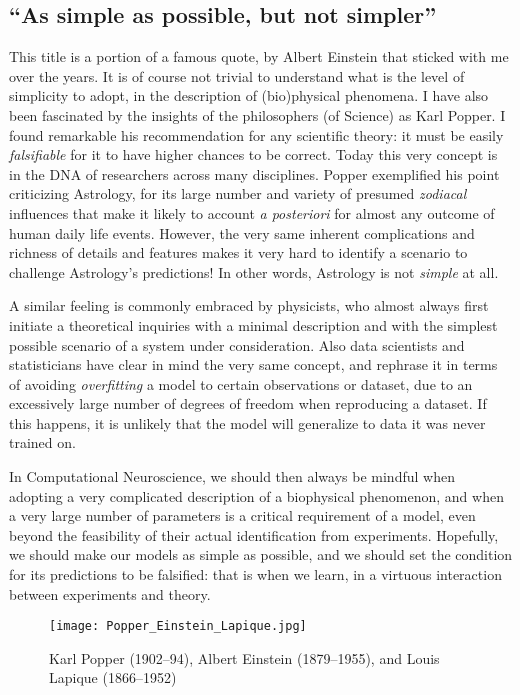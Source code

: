 \subsection{``As simple as possible, but not simpler''}
This title is a portion of a famous quote, by Albert Einstein that sticked with me over the years. It is of course not trivial to understand what is the level of simplicity to adopt, in the description of (bio)physical phenomena. I have also been fascinated by the insights of the philosophers (of Science) as Karl Popper. I found remarkable his recommendation for any scientific theory: it must be easily \textit{falsifiable} for it  to have higher chances to be correct. Today this very concept is in the DNA of researchers across many disciplines. Popper exemplified his point criticizing Astrology, for its large number and variety of presumed \textit{zodiacal} influences that make it likely to account \textit{a posteriori} for almost any outcome of human daily life events. However, the very same inherent complications and richness of details and features makes it very hard to identify a scenario to challenge Astrology's predictions! In other words, Astrology is not \textit{simple} at all.

A similar feeling is commonly embraced by physicists, who almost always first initiate a theoretical inquiries with a minimal description and with the simplest possible scenario of a system under consideration. Also data scientists and statisticians have clear in mind the very same concept, and rephrase it in terms of avoiding \textit{overfitting} a model to certain observations or dataset, due to an excessively large number of degrees of freedom when reproducing a dataset. If this happens, it is unlikely that the model will generalize to data it was never trained on.


In Computational Neuroscience, we should then always be mindful when adopting a very complicated description of a biophysical phenomenon, and when a very large number of parameters is a critical requirement of a model, even beyond the feasibility of their actual identification from experiments. Hopefully, we should make our models as simple as possible, and we should set the condition for its predictions to be falsified: that is when we learn, in a virtuous interaction between experiments and theory.

\begin{figure}[t]
	\centering
	\texttt{[image: Popper\_Einstein\_Lapique.jpg]}
	\caption{Karl Popper (1902--94), Albert Einstein (1879--1955), and Louis Lapique (1866--1952)}
	\label{fig3:PopperEinsteinLapique}       %
	\end{figure}




